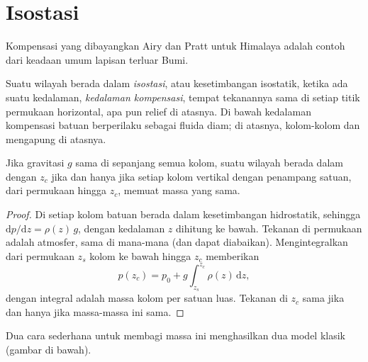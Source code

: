 \section{Isostasi}

Kompensasi yang dibayangkan Airy dan Pratt untuk Himalaya adalah contoh dari keadaan umum lapisan terluar Bumi.

\begin{definition}\label{def:b1:isostasy-gravity:isostasy}
Suatu wilayah berada dalam \emph{isostasi}, atau kesetimbangan isostatik, ketika ada suatu kedalaman, \emph{kedalaman kompensasi}, tempat tekanannya sama di setiap titik permukaan horizontal, apa pun relief di atasnya. Di bawah kedalaman kompensasi batuan berperilaku sebagai fluida diam; di atasnya, kolom-kolom  dan  mengapung di atasnya.
\end{definition}

\begin{proposition}\label{prop:b1:isostasy-gravity:equal-mass}
Jika gravitasi $g$ sama di sepanjang semua kolom, suatu wilayah berada dalam  dengan  $z_c$ jika dan hanya jika setiap kolom vertikal dengan penampang satuan, dari permukaan hingga $z_c$, memuat massa yang sama.
\end{proposition}

\begin{proof}
Di setiap kolom batuan berada dalam kesetimbangan hidrostatik, sehingga $\mathrm dp/\mathrm dz = \rho(z)\,g$, dengan kedalaman $z$ dihitung ke bawah. Tekanan di permukaan adalah atmosfer, sama di mana-mana (dan dapat diabaikan). Mengintegralkan dari permukaan $z_s$ kolom ke bawah hingga $z_c$ memberikan
\[
  p(z_c) = p_0 + g\int_{z_s}^{z_c}\rho(z)\,\mathrm dz ,
\]
dengan integral adalah massa kolom per satuan luas. Tekanan di $z_c$ sama jika dan hanya jika massa-massa ini sama.
\end{proof}

Dua cara sederhana untuk membagi massa ini menghasilkan dua model klasik (gambar di bawah).

